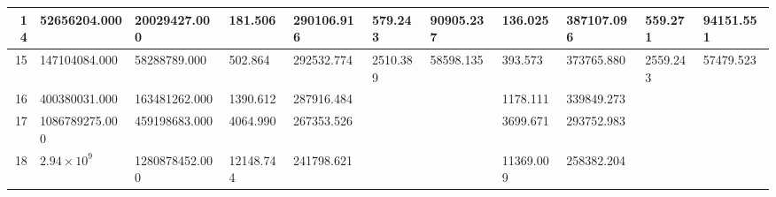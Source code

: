 \documentclass[conference]{IEEEtran}
\newcommand{\matr}[1]{\mathbf{#1}} %
\begin{document}
\begin{table*}[tb]
\begin{threeparttable}[c]
\begin{tabular}{r|ll|ll|ll|ll|ll}
\hline                                                                                                                                                                                                          
14 & \num{52656204.000} & \num{20029427.000} & \num{181.506} & \num{290106.916} & \num{579.243} & \num{90905.237} & \num{136.025} & \num{387107.096} & \num{559.271} & \num{94151.551} \\   
\hline                                                                                                                                                                                                          
15 & \num{147104084.000} & \num{58288789.000} & \num{502.864} & \num{292532.774} & \num{2510.389} & \num{58598.135} & \num{393.573} & \num{373765.880} & \num{2559.243} & \num{57479.523} \\
\hline                                                                                                                                                                                                          
16 & \num{400380031.000} & \num{163481262.000} & \num{1390.612} & \num{287916.484} &  &  & \num{1178.111} & \num{339849.273} &  &  \\                                                               
\hline                                                                                                                                                                                                          
17 & \num{1086789275.000} & \num{459198683.000} & \num{4064.990} & \num{267353.526} &  &  & \num{3699.671} & \num{293752.983} &  &  \\                                                              
\hline                                                                                                                                                                                                          
18 & $2.94 \times 10^9$
& \num{1280878452.000} & \num{12148.744} & \num{241798.621} &  &  & \num{11369.009} & \num{258382.204} &  &  \\
\end{tabular}
\end{threeparttable}
\end{table*}
\end{document}
